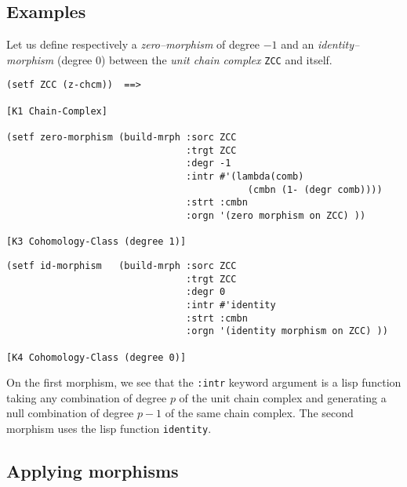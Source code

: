 \subsection*{Examples}

Let us define respectively a {\em zero--morphism} of degree $-1$
and an {\em identity--morphism} (degree $0$)  between  the {\em unit chain complex} {\tt ZCC} and itself.
{\footnotesize\begin{verbatim}
(setf ZCC (z-chcm))  ==>

[K1 Chain-Complex]

(setf zero-morphism (build-mrph :sorc ZCC
                                :trgt ZCC
                                :degr -1
                                :intr #'(lambda(comb)
                                           (cmbn (1- (degr comb))))
                                :strt :cmbn
                                :orgn '(zero morphism on ZCC) ))

[K3 Cohomology-Class (degree 1)]
\end{verbatim}}
\newpage
{\footnotesize\begin{verbatim}
(setf id-morphism   (build-mrph :sorc ZCC
                                :trgt ZCC
                                :degr 0
                                :intr #'identity
                                :strt :cmbn
                                :orgn '(identity morphism on ZCC) ))

[K4 Cohomology-Class (degree 0)]
\end{verbatim}}
On the first morphism, we see that the  {\tt :intr} keyword argument is a lisp function
taking any combination of degree $p$ of the  unit chain complex and generating a null
combination of degree $p-1$ of the same chain complex. The second morphism uses the lisp
function {\tt identity}.

\subsection{Applying morphisms}

